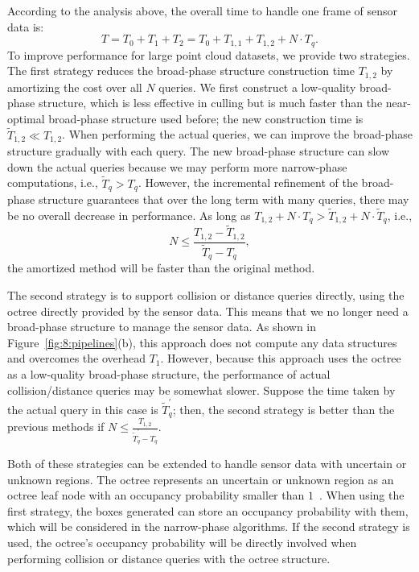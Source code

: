 According to the analysis above, the overall time to handle one
frame of sensor data is:
\begin{equation}
\label{eq:8:overalltime}
T = T_0 + T_1 + T_2 = T_0 + T_{1,1} + T_{1,2} + N \cdot T_q.
\end{equation}
To improve performance for large point cloud datasets, we provide two strategies. The first
strategy reduces the broad-phase structure construction time
$T_{1,2}$ by amortizing the cost over all $N$ queries. We first
construct a low-quality broad-phase structure, which is less effective
in culling but is much faster than the near-optimal broad-phase
structure used before; the new construction time is
$\widetilde{T}_{1,2} \ll T_{1,2}$. When performing the actual queries,
we can improve the broad-phase structure gradually with each
query. The new broad-phase structure can slow down the actual queries
because we may perform more narrow-phase computations, i.e.,
$\widetilde{T}_q > T_q$. However, the incremental refinement of the broad-phase structure guarantees that over the long term with many queries, there may be no overall decrease in performance. As long as $T_{1,2} + N \cdot T_q > \widetilde{T}_{1,2} + N
\cdot \widetilde{T}_q$, i.e.,
\begin{equation}
\label{eq:8:Nstrategy1}
N \leq \frac{T_{1,2} - \widetilde{T}_{1,2}}{\widetilde{T}_q - T_q},
\end{equation}
the amortized method will be faster than the original method.

The second strategy is to support collision or distance queries
directly, using the octree directly provided by the sensor data. This means that we no longer need a broad-phase structure to manage the sensor data. As shown in Figure~\ref{fig:8:pipelines}(b), this approach does not compute any data structures and overcomes the overhead $T_1$. However, because this approach uses the octree as a low-quality
broad-phase structure, the performance of actual collision/distance queries may be somewhat slower. Suppose the time taken by the actual query in this case
is $\widetilde{T}_q^\prime$; then, the second strategy is better than
the previous methods if $N \leq \frac{T_{1,2}}{\widetilde{T}_q^\prime - T_q}$.

Both of these strategies can be extended to handle sensor data with
uncertain or unknown regions. The octree represents an uncertain or
unknown region as an octree leaf node with an occupancy probability
smaller than $1$~\cite{octomap}. When using the first strategy, the
boxes generated can store an occupancy probability with them, which
will be considered in the narrow-phase algorithms. If the second
strategy is used, the octree's occupancy probability will be directly
involved when performing collision or distance queries with the
octree structure.


